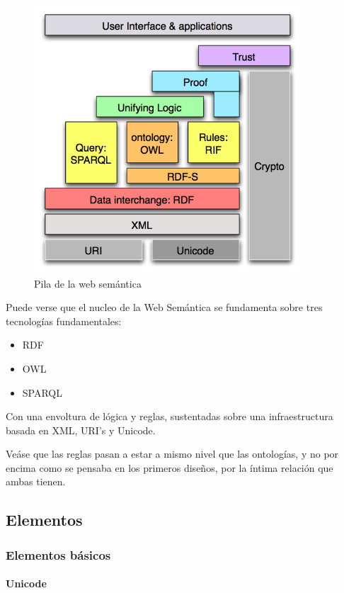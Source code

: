 \begin{figure}[tp]
	\centering
	\includegraphics[width=10cm]{images/semantic-web-stack.png}
	\caption{Pila de la web semántica}
	\label{fig:swStack}
\end{figure}

Puede verse que el nucleo de la Web Semántica se fundamenta sobre tres 
tecnologías fundamentales:

\begin{itemize}
  \item RDF
  \item OWL
  \item SPARQL
\end{itemize}

Con una envoltura de lógica y reglas, sustentadas sobre una infraestructura 
basada en XML, URI's y Unicode.

Veáse que las reglas pasan a estar a mismo nivel que las ontologías, y no por
encima como se pensaba en los primeros diseños, por la íntima relación que ambas
tienen.

\subsection{Elementos}

\subsubsection{Elementos básicos}

\paragraph{Unicode}

